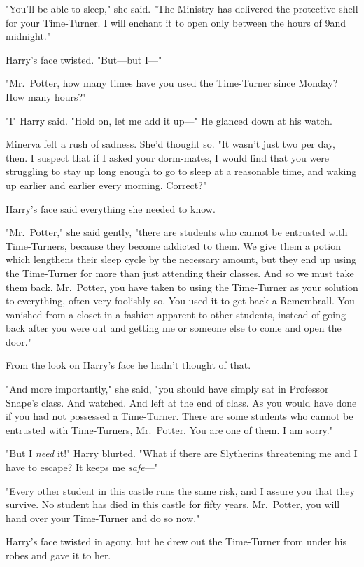 "You'll be able to sleep," she said. "The Ministry has delivered the protective
shell for your Time-Turner. I will enchant it to open only between the hours of
9\PM and midnight."

Harry's face twisted. "But---but I\mbox{---}"

"Mr.~Potter, how many times have you used the Time-Turner since Monday? How
many hours?"

"I{\el}" Harry said. "Hold on, let me add it up\mbox{---}" He glanced down at his
watch.

Minerva felt a rush of sadness. She'd thought so. "It wasn't just two per day,
then. I suspect that if I asked your dorm-mates, I would find that you were
struggling to stay up long enough to go to sleep at a reasonable time, and
waking up earlier and earlier every morning. Correct?"

Harry's face said everything she needed to know.

"Mr.~Potter," she said gently, "there are students who cannot be entrusted with
Time-Turners, because they become addicted to them. We give them a potion which
lengthens their sleep cycle by the necessary amount, but they end up using the
Time-Turner for more than just attending their classes. And so we must take
them back. Mr.~Potter, you have taken to using the Time-Turner as your solution
to everything, often very foolishly so. You used it to get back a Remembrall.
You vanished from a closet in a fashion apparent to other students, instead of
going back after you were out and getting me or someone else to come and open
the door."

From the look on Harry's face he hadn't thought of that.

"And more importantly," she said, "you should have simply sat in Professor
Snape's class. And watched. And left at the end of class. As you would have
done if you had not possessed a Time-Turner. There are some students who cannot
be entrusted with Time-Turners, Mr.~Potter. You are one of them. I am sorry."

"But I \emph{need} it!" Harry blurted. "What if there are Slytherins
threatening me and I have to escape? It keeps me \emph{safe}\mbox{---}"

"Every other student in this castle runs the same risk, and I assure you that
they survive. No student has died in this castle for fifty years. Mr.~Potter,
you will hand over your Time-Turner and do so now."

Harry's face twisted in agony, but he drew out the Time-Turner from under his
robes and gave it to her.

